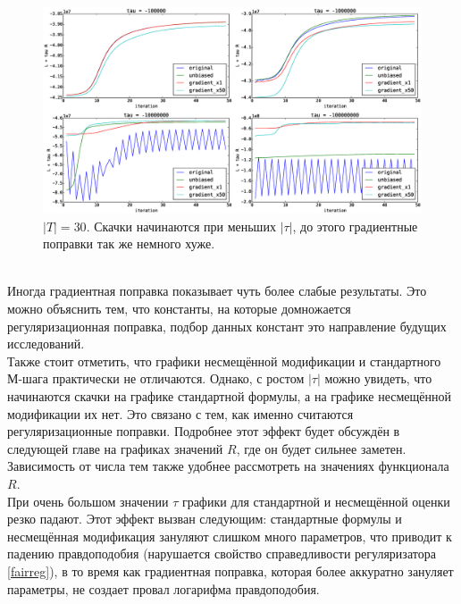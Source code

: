 \documentclass[12pt]{article}
\begin{document}
\begin{figure}[H]
	\centering
	\caption{$|T| = 30$. Скачки начинаются при меньших $|\tau|$, до этого градиентные поправки так же немного хуже.}      
	\medskip
	\includegraphics[width=1.0\linewidth]{pictures/topics_30_LR_values}
\end{figure}
\ \\
Иногда градиентная поправка показывает чуть более слабые результаты. Это можно объяснить тем, что константы, на которые домножается регуляризационная поправка,  подбор данных констант это направление будущих исследований. \\
Также стоит отметить, что  графики несмещённой модификации и стандартного М-шага практически не отличаются. Однако, с ростом $|\tau|$ можно увидеть, что начинаются скачки на графике стандартной формулы, а на графике несмещённой модификации их нет. Это связано с тем, как именно считаются регуляризационные поправки. Подробнее этот эффект будет обсуждён в следующей главе на графиках значений $R$, где он будет сильнее заметен.\\
Зависимость от числа тем также удобнее рассмотреть на значениях функционала $R$.\\
При очень большом значении $\tau$ графики для стандартной и несмещённой оценки резко падают. Этот эффект вызван следующим: стандартные формулы и несмещённая модификация зануляют слишком много параметров, что приводит к падению правдоподобия (нарушается свойство справедливости регуляризатора \ref{fairreg}), в то время как градиентная поправка, которая более аккуратно зануляет параметры, не создает провал логарифма правдоподобия.
\end{document}
